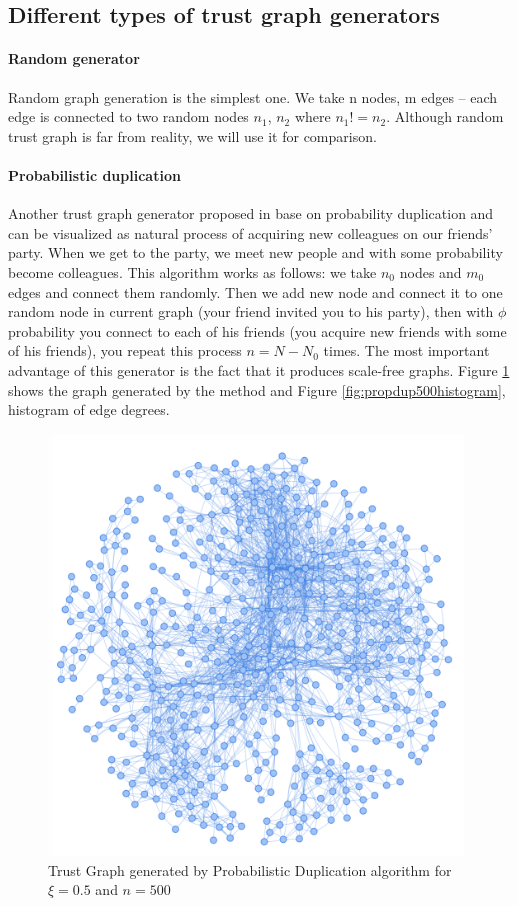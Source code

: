 \documentclass[nostrict]{szablonPG}
\begin{document}
\subsection{Different types of trust graph generators}
\paragraph{Random generator}
Random graph generation is the simplest one. We take n nodes, m edges -- each edge is connected to two random nodes $n_1$, $n_2$ where $n_1 != n_2$. Although random trust graph is far from reality, we will use it for comparison.

\paragraph{Probabilistic duplication}
Another trust graph generator proposed in \cite{konorski2019mitigating} base on probability duplication and can be visualized as natural process of acquiring new colleagues on our friends' party. When we get to the party, we meet new people and with some probability become colleagues. This algorithm works as follows: we take $n_0$ nodes and $m_0$ edges and connect them randomly. Then we add new node and connect it to one random node in current graph (your friend invited you to his party), then with $\phi$ probability you connect to each of his friends (you acquire new friends with some of his friends), you repeat this process $n = N - N_0$ times. 
The most important advantage of this generator is the fact that it produces scale-free graphs. Figure \ref{fig:propdup500graph} shows the graph generated by the method and Figure \ref{fig:propdup500histogram}, histogram of edge degrees.

\begin{figure}[h!]
    \includegraphics[width=11cm]{img/propDup500Graph.png}
    \centering
    \caption{Trust Graph generated by Probabilistic Duplication algorithm for $\xi=0.5$ and $n = 500$}
    \label{fig:propdup500graph}
\end{figure}
\end{document}
